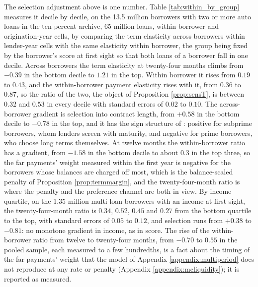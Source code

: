 The selection adjustment above is one number. Table \ref{tab:within_by_group} measures it decile by decile, on the 13.5 million borrowers with two or more auto loans in the ten-percent archive, 65 million loans, within borrower and origination-year cells, by comparing the term elasticity across borrowers within lender-year cells with the same elasticity within borrower, the group being fixed by the borrower's score at first sight so that both loans of a borrower fall in one decile. Across borrowers the term elasticity at twenty-four months climbs from $-0.39$ in the bottom decile to $1.21$ in the top. Within borrower it rises from $0.19$ to $0.43$, and the within-borrower payment elasticity rises with it, from $0.36$ to $0.87$, so the ratio of the two, the object of Proposition \ref{prop:sensT}, is between $0.32$ and $0.53$ in every decile with standard errors of $0.02$ to $0.10$. The across-borrower gradient is selection into contract length, from $+0.58$ in the bottom decile to $-0.78$ in the top, and it has the sign structure of \citet{hertzberg_screening_2018}: positive for subprime borrowers, whom lenders screen with maturity, and negative for prime borrowers, who choose long terms themselves. At twelve months the within-borrower ratio has a gradient, from $-1.58$ in the bottom decile to about $0.3$ in the top three, so the far payments' weight measured within the first year is negative for the borrowers whose balances are charged off most, which is the balance-scaled penalty of Proposition \ref{prop:termmargin}, and the twenty-four-month ratio is where the penalty and the preference channel are both in view. By income quartile, on the 1.35 million multi-loan borrowers with an income at first sight, the twenty-four-month ratio is $0.34$, $0.52$, $0.45$ and $0.27$ from the bottom quartile to the top, with standard errors of $0.05$ to $0.12$, and selection runs from $+0.38$ to $-0.81$: no monotone gradient in income, as in score. The rise of the within-borrower ratio from twelve to twenty-four months, from $-0.70$ to $0.55$ in the pooled sample, each measured to a few hundredths, is a fact about the timing of the far payments' weight that the model of Appendix \ref{appendix:multiperiod} does not reproduce at any rate or penalty (Appendix \ref{appendix:mcliquidity}); it is reported as measured.

